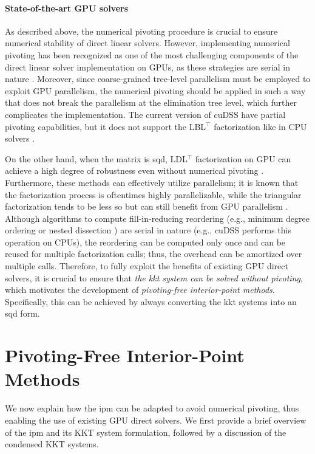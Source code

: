 \documentclass{article}
\begin{document}
\paragraph{State-of-the-art GPU solvers}
As described above, the numerical pivoting procedure is crucial to ensure numerical stability of direct linear solvers. However, implementing numerical pivoting has been recognized as one of the most challenging components of the direct linear solver implementation on GPUs, as  these strategies are serial in nature \cite{swirydowiczLinearSolversPower2022}. Moreover, since coarse-grained tree-level parallelism must be employed to exploit GPU parallelism, the numerical pivoting should be applied in such a way that does not break the parallelism at the elimination tree level, which further complicates the implementation. The current version of cuDSS have partial pivoting capabilities, but it does not support the LBL$^\top$ factorization like in CPU solvers \cite{nvidiaNVIDIACuDSSPreview}.

On the other hand, when the matrix is \gls*{sqd}, LDL$^\top$ factorization on GPU can achieve a high degree of robustness even without numerical pivoting \cite{vanderbeiSymmetricQuasidefiniteMatrices1995}. Furthermore, these methods can effectively utilize parallelism; it is known that the factorization process is oftentimes highly parallelizable, while the triangular factorization tends to be less so but can still benefit from GPU parallelism \cite{naumovParallelSolutionSparse}. Although algorithms to compute fill-in-reducing reordering (e.g., minimum degree ordering \cite{amestoyApproximateMinimumDegree1996} or nested dissection \cite{karypisMETISSoftwarePackage1997}) are serial in nature (e.g., cuDSS performs this operation on CPUs), the reordering can be computed only once and can be reused for multiple factorization calls; thus, the overhead can be amortized over multiple calls. Therefore, to fully exploit the benefits of existing GPU direct solvers, it is crucial to ensure that \emph{the \gls*{kkt} system can be solved without pivoting}, which motivates the development of \emph{pivoting-free interior-point methods}. Specifically, this can be achieved by always converting the \gls*{kkt} systems into an \gls*{sqd} form.



\section{Pivoting-Free Interior-Point Methods}\label{eqn:ipm}
We now explain how the \gls*{ipm} can be adapted to avoid numerical pivoting, thus enabling the use of existing GPU direct solvers. We first provide a brief overview of the \gls*{ipm} and its KKT system formulation, followed by a discussion of the condensed KKT systems.
\end{document}
